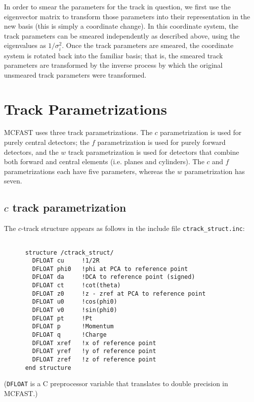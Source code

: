 In order to smear the parameters for the track in question, we first
use the eigenvector matrix to transform those parameters into their
representation in the new basis (this is simply a coordinate change).  In
this coordinate system, the track parameters can be smeared independently as
described above, using the eigenvalues as $1/\sigma_i^2$.  Once the track
parameters are smeared, the coordinate system is rotated back into the
familiar basis; that is, the smeared track parameters are transformed by the
inverse process by which the original unsmeared track parameters were
transformed.

\section{Track Parametrizations}

MCFAST uses three track parametrizations.  The $c$ parametrization is used
for purely central detectors; the $f$ parametrization is used for purely
forward detectors, and the $w$ track parametrization is used for detectors
that combine both forward and central elements (i.e. planes and cylinders).
The $c$ and $f$ parametrizations each have five parameters, whereas the
$w$ parametrization has seven.

\subsection{$c$ track parametrization}

The $c$-track structure appears as follows in the include file
\verb'ctrack_struct.inc':

\begin{verbatim}

      structure /ctrack_struct/
        DFLOAT cu     !1/2R
        DFLOAT phi0   !phi at PCA to reference point
        DFLOAT da     !DCA to reference point (signed)
        DFLOAT ct     !cot(theta)
        DFLOAT z0     !z - zref at PCA to reference point
        DFLOAT u0     !cos(phi0)
        DFLOAT v0     !sin(phi0)
        DFLOAT pt     !Pt
        DFLOAT p      !Momentum
        DFLOAT q      !Charge
        DFLOAT xref   !x of reference point
        DFLOAT yref   !y of reference point
        DFLOAT zref   !z of reference point
      end structure

\end{verbatim}

(\verb'DFLOAT' is a C preprocessor variable that translates to double
precision in MCFAST.)

